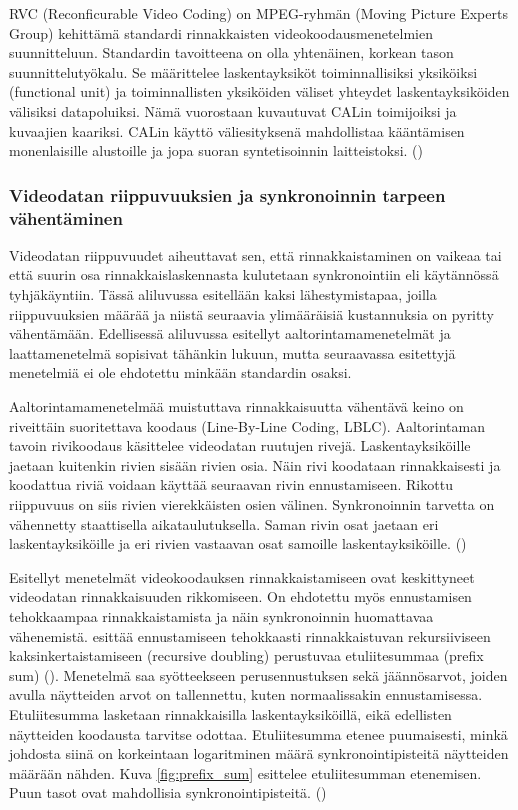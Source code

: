 RVC (Reconficurable Video Coding) on MPEG-ryhmän (Moving Picture Experts
Group) kehittämä standardi rinnakkaisten videokoodausmenetelmien suunnitteluun.
Standardin tavoitteena on olla yhtenäinen, korkean tason suunnittelutyökalu.
Se määrittelee laskentayksiköt toiminnallisiksi yksiköiksi (functional unit)
ja toiminnallisten yksiköiden väliset yhteydet laskentayksiköiden välisiksi
datapoluiksi. Nämä vuorostaan kuvautuvat CALin toimijoiksi ja kuvaajien
kaariksi. CALin käyttö väliesityksenä mahdollistaa kääntämisen monenlaisille
alustoille ja jopa suoran syntetisoinnin laitteistoksi. (\citealt{rvc})

\subsubsection{Videodatan riippuvuuksien ja synkronoinnin tarpeen vähentäminen}

Videodatan riippuvuudet aiheuttavat sen, että rinnakkaistaminen on vaikeaa tai
että suurin osa rinnakkaislaskennasta kulutetaan synkronointiin eli käytännössä
tyhjäkäyntiin. Tässä aliluvussa esitellään kaksi lähestymistapaa, joilla
riippuvuuksien määrää ja niistä seuraavia ylimääräisiä kustannuksia on pyritty
vähentämään. Edellisessä aliluvussa esitellyt aaltorintamamenetelmät ja
laattamenetelmä sopisivat tähänkin lukuun, mutta seuraavassa esitettyjä
menetelmiä ei ole ehdotettu minkään standardin osaksi.

Aaltorintamamenetelmää muistuttava rinnakkaisuutta vähentävä keino on riveittäin
suoritettava koodaus (Line-By-Line Coding, LBLC). Aaltorintaman tavoin
rivikoodaus käsittelee videodatan ruutujen rivejä. Laskentayksiköille jaetaan
kuitenkin rivien sisään rivien osia. Näin rivi koodataan rinnakkaisesti ja
koodattua riviä voidaan käyttää seuraavan rivin ennustamiseen. Rikottu
riippuvuus on siis rivien vierekkäisten osien välinen. Synkronoinnin tarvetta
on vähennetty staattisella aikataulutuksella. Saman rivin osat jaetaan eri
laskentayksiköille ja eri rivien vastaavan osat samoille laskentayksiköille.
(\citealt{xu})

Esitellyt menetelmät videokoodauksen rinnakkaistamiseen ovat keskittyneet
videodatan rinnakkaisuuden rikkomiseen. On ehdotettu myös ennustamisen
tehokkaampaa rinnakkaistamista ja näin synkronoinnin huomattavaa vähenemistä.
\citealt{pieters} esittää ennustamiseen tehokkaasti rinnakkaistuvan
rekursiiviseen kaksinkertaistamiseen (recursive doubling) perustuvaa
etuliitesummaa (prefix sum) (\citealt{blelloch}). Menetelmä saa syötteekseen
perusennustuksen sekä jäännösarvot, joiden avulla näytteiden arvot on
tallennettu, kuten normaalissakin ennustamisessa. Etuliitesumma lasketaan
rinnakkaisilla laskentayksiköillä, eikä edellisten näytteiden koodausta
tarvitse odottaa. Etuliitesumma etenee puumaisesti, minkä johdosta siinä on
korkeintaan logaritminen määrä synkronointipisteitä näytteiden määrään nähden.
Kuva \ref{fig:prefix_sum} esittelee etuliitesumman etenemisen. Puun tasot ovat
mahdollisia synkronointipisteitä. (\citealt{pieters})

